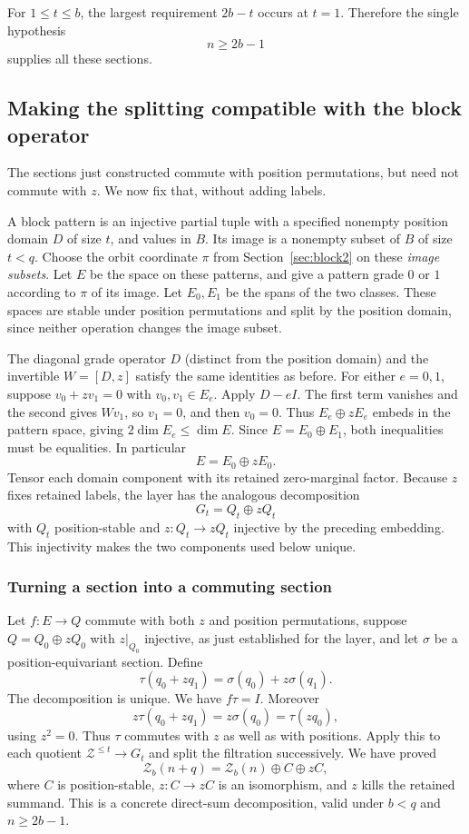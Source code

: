 \documentclass[11pt,a4paper]{article}
\theoremstyle{definition}\newtheorem{definition}[theorem]{Definition}
\theoremstyle{remark}\newtheorem{remark}[theorem]{Remark}
\begin{document}
For $1\le t\le b$, the largest requirement $2b-t$ occurs at $t=1$. Therefore the single hypothesis
\begin{equation}\label{eq:linearlabel}n\ge2b-1\end{equation}
supplies all these sections.

\subsection{Making the splitting compatible with the block operator}\label{sec:blocksplitting}
The sections just constructed commute with position permutations, but need not commute with $z$. We now fix that, without adding labels.

A block pattern is an injective partial tuple with a specified nonempty position domain $D$ of size $t$, and values in $B$. Its image is a nonempty subset of $B$ of size $t<q$. Choose the orbit coordinate $\pi$ from Section~\ref{sec:block2} on these \emph{image subsets}. Let $E$ be the space on these patterns, and give a pattern grade $0$ or $1$ according to $\pi$ of its image. Let $E_0,E_1$ be the spans of the two classes. These spaces are stable under position permutations and split by the position domain, since neither operation changes the image subset.

The diagonal grade operator $D$ (distinct from the position domain) and the invertible $W=[D,z]$ satisfy the same identities as before. For either $e=0,1$, suppose $v_0+zv_1=0$ with $v_0,v_1\in E_e$. Apply $D-eI$. The first term vanishes and the second gives $Wv_1$, so $v_1=0$, and then $v_0=0$. Thus $E_e\oplus zE_e$ embeds in the pattern space, giving $2\dim E_e\le\dim E$. Since $E=E_0\oplus E_1$, both inequalities must be equalities. In particular
\[E=E_0\oplus zE_0.
\]
Tensor each domain component with its retained zero-marginal factor. Because $z$ fixes retained labels, the layer has the analogous decomposition
\[G_t=Q_t\oplus zQ_t
\]
with $Q_t$ position-stable and $z:Q_t\to zQ_t$ injective by the preceding embedding. This injectivity makes the two components used below unique.

\subsubsection{Turning a section into a commuting section}
Let $f:E\to Q$ commute with both $z$ and position permutations,
suppose $Q=Q_0\oplus zQ_0$ with $z|_{Q_0}$ injective, as just
established for the layer, and let $\sigma$ be a position-equivariant
section. Define
\[\tau(q_0+zq_1)=\sigma(q_0)+z\sigma(q_1).
\]
The decomposition is unique. We have $f\tau=I$. Moreover
\[z\tau(q_0+zq_1)=z\sigma(q_0)=\tau(zq_0),
\]
using $z^2=0$. Thus $\tau$ commutes with $z$ as well as with positions. Apply this to each quotient $\mathcal Z^{\le t}\to G_t$ and split the filtration successively. We have proved
\begin{equation}\label{eq:socsplit2}
\mathcal Z_b(n+q)=\mathcal Z_b(n)\oplus C\oplus zC,
\end{equation}
where $C$ is position-stable, $z:C\to zC$ is an isomorphism, and $z$ kills the retained summand. This is a concrete direct-sum decomposition, valid under $b<q$ and $n\ge2b-1$.
\end{document}
